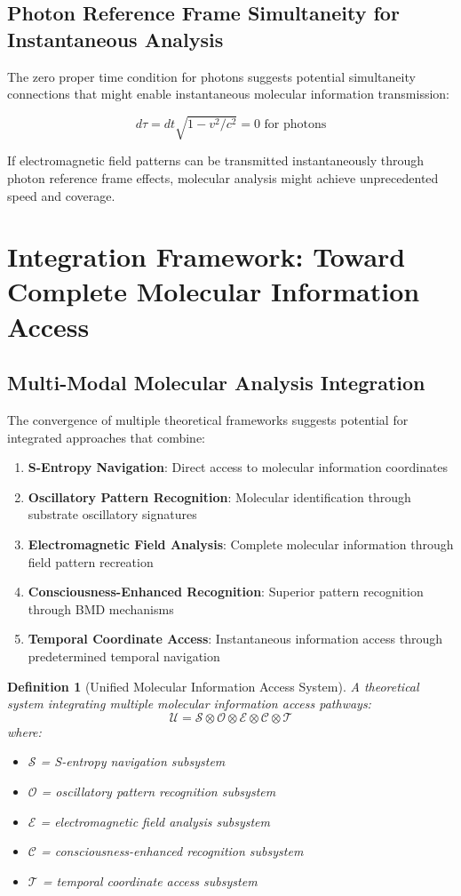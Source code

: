 \documentclass[11pt,a4paper]{article}
\newtheorem{definition}[theorem]{Definition}
\theoremstyle{remark}
\begin{document}
\subsection{Photon Reference Frame Simultaneity for Instantaneous Analysis}

The zero proper time condition for photons suggests potential simultaneity connections that might enable instantaneous molecular information transmission:

$$d\tau = dt\sqrt{1-v^2/c^2} = 0 \text{ for photons}$$

If electromagnetic field patterns can be transmitted instantaneously through photon reference frame effects, molecular analysis might achieve unprecedented speed and coverage.

\section{Integration Framework: Toward Complete Molecular Information Access}

\subsection{Multi-Modal Molecular Analysis Integration}

The convergence of multiple theoretical frameworks suggests potential for integrated approaches that combine:

\begin{enumerate}
\item \textbf{S-Entropy Navigation}: Direct access to molecular information coordinates
\item \textbf{Oscillatory Pattern Recognition}: Molecular identification through substrate oscillatory signatures
\item \textbf{Electromagnetic Field Analysis}: Complete molecular information through field pattern recreation
\item \textbf{Consciousness-Enhanced Recognition}: Superior pattern recognition through BMD mechanisms
\item \textbf{Temporal Coordinate Access}: Instantaneous information access through predetermined temporal navigation
\end{enumerate}

\begin{definition}[Unified Molecular Information Access System]
A theoretical system integrating multiple molecular information access pathways:
$$\mathcal{U} = \mathcal{S} \otimes \mathcal{O} \otimes \mathcal{E} \otimes \mathcal{C} \otimes \mathcal{T}$$
where:
\begin{itemize}
\item $\mathcal{S}$ = S-entropy navigation subsystem
\item $\mathcal{O}$ = oscillatory pattern recognition subsystem  
\item $\mathcal{E}$ = electromagnetic field analysis subsystem
\item $\mathcal{C}$ = consciousness-enhanced recognition subsystem
\item $\mathcal{T}$ = temporal coordinate access subsystem
\end{itemize}
\end{definition}
\end{document}

